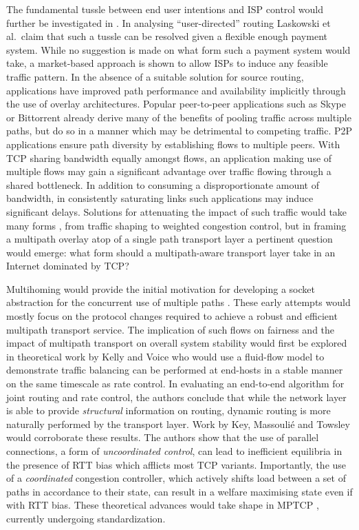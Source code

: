 The fundamental tussle between end user intentions and \ac{ISP} control would further be investigated in \cite{Laskowski:2008p244}.
In analysing ``user-directed'' routing Laskowski et al.\ claim that such a tussle can be resolved given a flexible enough payment system.
While no suggestion is made on what form such a payment system would take, a market-based approach is shown to allow \acp{ISP} to induce any feasible traffic pattern.
In the absence of a suitable solution for source routing, applications have improved path performance and availability implicitly through the use of overlay architectures.
Popular peer-to-peer applications such as Skype or Bittorrent already derive many of the benefits of pooling traffic across multiple paths, but do so in a manner which may be detrimental to competing traffic.
\ac{P2P} applications ensure path diversity by establishing flows to multiple peers.
With \ac{TCP} sharing bandwidth equally amongst flows, an application making use of multiple flows may gain a significant advantage over traffic flowing through a shared bottleneck.
In addition to consuming a disproportionate amount of bandwidth, in consistently saturating links such applications may induce significant delays.
Solutions for attenuating the impact of such traffic would take many forms \cite{Peterson:2009p178}, from traffic shaping to weighted congestion control, but in framing a multipath overlay atop of a single path transport layer a pertinent question would emerge: what form should a multipath-aware transport layer take in an Internet dominated by \ac{TCP}?

Multihoming would provide the initial motivation for developing a socket abstraction for the concurrent use of multiple paths \cite{Huitema:1995p543,Hsieh:2002p538,Iyengar:2006p542}.
These early attempts would mostly focus on the protocol changes required to achieve a robust and efficient multipath transport service.
The implication of such flows on fairness and the impact of multipath transport on overall system stability would first be explored in theoretical work by Kelly and Voice \cite{Kelly:2005p140} who would use a fluid-flow model to demonstrate traffic balancing can be performed at end-hosts in a stable manner on the same timescale as rate control.
In evaluating an end-to-end algorithm for joint routing and rate control, the authors conclude that while the network layer is able to provide \emph{structural} information on routing, dynamic routing is more naturally performed by the transport layer.
Work by Key, Massouli\'{e} and Towsley \cite{Key:2007p130} would corroborate these results. 
The authors show that the use of parallel connections, a form of \emph{uncoordinated control}, can lead to inefficient equilibria in the presence of \ac{RTT} bias which afflicts most \ac{TCP} variants. Importantly, the use of a \emph{coordinated} congestion controller, which actively shifts load between a set of paths in accordance to their state, can result in a welfare maximising state even if with \ac{RTT} bias.
These theoretical advances would take shape in \ac{MPTCP} \cite{Wischik:2011p540}, currently undergoing standardization.

